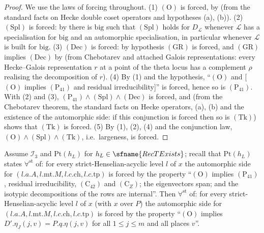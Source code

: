 \begin{proof}
We use the laws of forcing throughout.
(1) $(\mathrm{O})$ is forced, by  (from the standard facts
on Hecke double coset operators and hypotheses (a), (b)).
(2) $(\mathrm{Spl})$ is forced: by  there is $\mathrm{big}$
such that $(\mathrm{Spl})$ holds for $D_{\mathcal L}$ whenever $\mathcal L$ has a specialisation for $\mathrm{big}$ and an
automorphic specialisation, in particular whenever $\mathcal L$ is built for $\mathrm{big}$.
(3) $(\mathrm{Dec})$ is forced: by hypothesis $(\mathrm{GR})$ is forced, and $(\mathrm{GR})$ implies $(\mathrm{Dec})$ by
 (from Chebotarev and attached Galois representations:
every Hecke--Galois representation $r$ at a point of the theta locus has a complement $\rho$ realising the
decomposition of $r$).
(4) By (1) and the hypothesis, ``$(\mathrm{O})$ and [$(\mathrm{O})$ implies $(\mathrm{P}_{41})$ and residual
irreducibility]'' is forced, hence so is $(\mathrm{P}_{41})$. With (2) and (3), $(\mathrm{P}_{41})\wedge(\mathrm{Spl})\wedge(\mathrm{Dec})$
is forced, and  (from the Chebotarev theorem, the
standard facts on Hecke operators, (a), (b) and the existence of the automorphic side: if this conjunction is
forced then so is $(\mathrm{Tk})$) shows that $(\mathrm{Tk})$ is forced.
(5) By (1), (2), (4) and the conjunction law, $(\mathrm{O})\wedge(\mathrm{Spl})\wedge(\mathrm{Tk})$, i.e.\ largeness, is
forced.
\end{proof}

\begin{proposition}\label{pf:baselat2:etaj}
Assume $\mathcal I_3$ and $\mathrm{Pt}(h_L)$ for $h_L\in\sfname{RecTExists}$; recall that $\mathrm{Pt}(h_L)$ states
$\forall^{\mathrm{st}}$ of: for every strict-Henselian-acyclic level $l$ of $x$ the automorphic side for
$(l.a.A,l.\mathrm{mt}.M,l.c.\mathrm{ch},l.c.\mathrm{tp})$ is forced by the property ``$(\mathrm{O})$ implies
$(\mathrm{P}_{41})$, residual irreducibility, $(\mathrm{C}_{42})$ and $(\mathrm{C}_Z)$; the eigenvectors span; and
the isotypic decompositions of the rows are internal''. Then $\forall^{\mathrm{st}}$ of: for every
strict-Henselian-acyclic level $l$ of $x$ (with $x$ over $P$) the automorphic side for
$(l.a.A,l.\mathrm{mt}.M,l.c.\mathrm{ch},l.c.\mathrm{tp})$ is forced by the property ``$(\mathrm{O})$ implies
$D'.\eta_J(j,v)=P.q.\eta(j,v)$ for all $1\le j\le m$ and all places $v$''.
\end{proposition}

